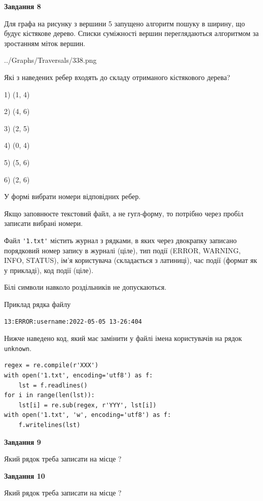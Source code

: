 \documentclass[12pt, ukrainian]{article}
\def\code#1{\Verb!#1!}
\begin{document}
{\begin {large}
{\begin {center}\textbf{Завдання 8}\end {center}}\par
Для графа на рисунку з вершини 5 запущено алгоритм пошуку в ширину, що будує кістякове дерево. Списки суміжності вершин переглядаються алгоритмом за зростанням міток вершин.\par
\begin{center}
	{../Graphs/Traversals/338.png}
\end{center}
\par Які з наведених ребер входять до складу отриманого кістякового дерева?\par
1) (1, 4)\par
2) (4, 6)\par
3) (2, 5)\par
4) (0, 4)\par
5) (5, 6)\par
6) (2, 6)\par
{\vskip 15pt} У формі вибрати номери відповідних ребер.


Якщо заповнюєте текстовий файл, а не гугл-форму, то потрібно через пробіл записа\-ти вибрані номери.\par
\newpage


Файл \code{'1.txt'} містить журнал з рядками, в яких через двокрапку записано поряд\-ко\-вий номер запису в журналі (ціле), тип події (ERROR, WARNING, INFO, STATUS), ім'я користувача (складається з латиниці), час події (фор\-мат як у прикладі), код події (ціле).

Білі символи навколо роздільників не допускаються.

Приклад рядка файлу



\begin{verbatim}
13:ERROR:username:2022-05-05 13-26:404
\end{verbatim}


Нижче наведено код, який має замінити у файлі імена користувачів на рядок \code{unknown}.



\begin{verbatim}
regex = re.compile(r'XXX')
with open('1.txt', encoding='utf8') as f:
    lst = f.readlines()
for i in range(len(lst)):
    lst[i] = re.sub(regex, r'YYY', lst[i])
with open('1.txt', 'w', encoding='utf8') as f:
    f.writelines(lst)
\end{verbatim}




{\begin {center}\textbf{Завдання 9}\end {center}}\par
Який рядок треба записати на місце  ?\par
\vspace{5mm}


{\begin {center}\textbf{Завдання 10}\end {center}}\par
Який рядок треба записати на місце  ?\par


\newpage


\end {large}}
\end{document}
